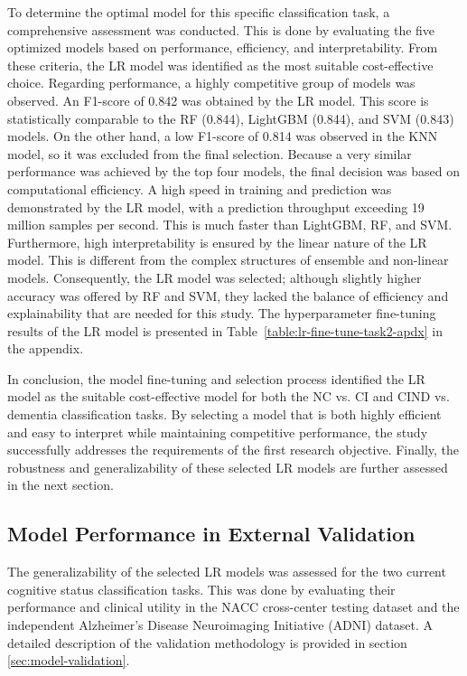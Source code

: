 To determine the optimal model for this specific classification task, a comprehensive assessment was conducted. This is done by evaluating the five optimized models based on performance, efficiency, and interpretability. From these criteria, the LR model was identified as the most suitable cost-effective choice. Regarding performance, a highly competitive group of models was observed. An F1-score of 0.842 was obtained by the LR model. This score is statistically comparable to the RF (0.844), LightGBM (0.844), and SVM (0.843) models. On the other hand, a low F1-score of 0.814 was observed in the KNN model, so it was excluded from the final selection. Because a very similar performance was achieved by the top four models, the final decision was based on computational efficiency. A high speed in training and prediction was demonstrated by the LR model, with a prediction throughput exceeding 19 million samples per second.  This is much faster than LightGBM, RF, and SVM. Furthermore, high interpretability is ensured by the linear nature of the LR model. This is different from the complex structures of ensemble and non-linear models. Consequently, the LR model was selected; although slightly higher accuracy was offered by RF and SVM, they lacked the balance of efficiency and explainability that are needed for this study. The hyperparameter fine-tuning results of the LR model is presented in Table~\ref{table:lr-fine-tune-task2-apdx} in the appendix.

In conclusion, the model fine-tuning and selection process identified the LR model as the suitable cost-effective model for both the NC vs. CI and CIND vs. dementia classification tasks. By selecting a model that is both highly efficient and easy to interpret while maintaining competitive performance, the study successfully addresses the requirements of the first research objective. Finally, the robustness and generalizability of these selected LR models are further assessed in the next section.

\subsection{Model Performance in External Validation}
\label{sec:classification_external_validation}
The generalizability of the selected LR models was assessed for the two current cognitive status classification tasks. This was done by evaluating their performance and clinical utility in the NACC cross-center testing dataset and the independent Alzheimer's Disease Neuroimaging Initiative (\acrshort{ADNI}) dataset. A detailed description of the validation methodology is provided in section \ref{sec:model-validation}.

